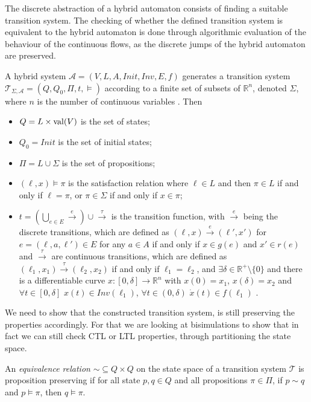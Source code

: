 The discrete abstraction of a hybrid automaton consists of finding a suitable transition system. The checking of whether the defined transition system is equivalent to the hybrid automaton is done through algorithmic evaluation of the behaviour of the continuous flows, as the discrete jumps of the hybrid automaton are preserved.

A hybrid system $\mathcal{A}=(V,L,A,Init,Inv,E,f)$ generates a transition system $\mathcal{T}_{\Sigma,\mathcal{A}}=(Q,Q_{0},\Pi,t,\models)$ according to a finite set of subsets of $\mathbb{R}^{n}$, denoted $\Sigma$, where $n$ is the number of continuous variables \cite{Alur2000}. Then
\begin{itemize}
\item{$Q=L\times \operatorname{val}(V)$ is the set of states;}
\item{$Q_{0}=Init$ is the set of initial states;}
\item{$\Pi=L\cup\Sigma$ is the set of propositions;}
\item{$(\ell,x)\models\pi$ is the satisfaction relation where $\ell\in L$ and then $\pi\in L$ if and only if $\ell = \pi$, or $\pi\in\Sigma$ if and only if $x\in\pi$;}
\item{$t=(\bigcup_{e\in E}\overset{e}{\rightarrow})\cup \overset{\tau}{\rightarrow}$ is the
transition function, with $\overset{e}{\rightarrow}$ being the discrete transitions, which are
defined as $(\ell,x)\overset{e}{\rightarrow}(\ell',x')$ for $e=(\ell,a,\ell')\in E$ for any
$a\in A$ if and only if $x\in g(e)$ and $x' \in r(e)$ and $\overset{\tau}{\rightarrow}$ are
continuous transitions, which are defined as
$(\ell_{1},x_{1})\overset{\tau}{\rightarrow}(\ell_{2},x_{2})$ if and only if $\ell_{1}=\ell_{2}$,
and $\exists \delta \in \mathbb{R}^{+}\setminus\{ 0\}$ and there is a differentiable curve
$x:[0,\delta]\rightarrow \mathbb{R}^{n}$ with $x(0)=x_{1}$, $x(\delta)=x_{2}$ and
$\forall t\in[0,\delta]$ $x(t)\in Inv(\ell_{1})$, $\forall t\in (0,\delta)$
$\dot{x}(t)\in f(\ell_{1})$ .}
\end{itemize}


We need to show that the constructed transition system, is still preserving the properties accordingly. For that we are looking at bisimulations to show that in fact we can still check CTL or LTL properties, through partitioning the state space.

\begin{defi}
An \emph{equivalence relation} $\sim\subseteq Q\times Q$ on the state space of a transition system $\mathcal{T}$ is proposition preserving if for all state $p,q\in Q$ and all propositions $\pi\in\Pi$, if $p\sim q$ and $p\models\pi$, then $q\models\pi$.
\end{defi}

